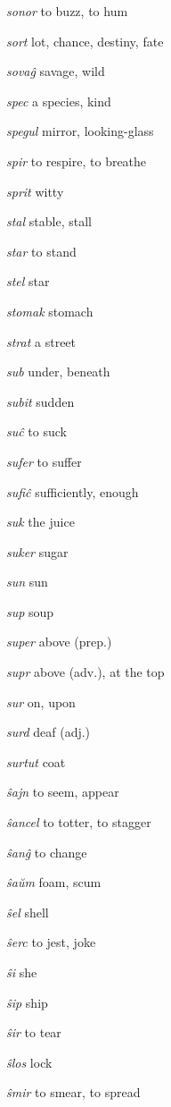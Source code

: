 \begin{landscape}
\begin{multicols}{5}
\begin{outdent}{1em}
\emph{sonor}  to buzz, to hum

\emph{sort } lot, chance, destiny, fate

\emph{sovaĝ}  savage, wild

\emph{spec}  a species, kind

\emph{spegul}  mirror, looking-glass

\emph{spir } to respire, to breathe

\emph{sprit}  witty

\emph{stal}  stable, stall

\emph{star}  to stand

\emph{stel}  star

\emph{stomak}  stomach

\emph{strat}  a street

\emph{sub } under, beneath

\emph{subit}  sudden

\emph{suĉ}  to suck

\emph{sufer}  to suffer

\emph{sufiĉ } sufficiently, enough

\emph{suk } the juice

\emph{suker}  sugar

\emph{sun } sun

\emph{sup } soup

\emph{super}  above (prep.)

\emph{supr}  above (adv.), at the top

\emph{sur}  on, upon

\emph{surd}  deaf (adj.)

\emph{surtut}  coat
\end{outdent}


\begin{outdent}{1em}
\emph{ŝajn}  to seem, appear

\emph{ŝancel}  to totter, to stagger

\emph{ŝanĝ}  to change

\emph{ŝaŭm}  foam, scum

\emph{ŝel}  shell

\emph{ŝerc}  to jest, joke

\emph{ŝi } she

\emph{ŝip } ship

\emph{ŝir}  to tear

\emph{ŝlos}  lock

\emph{ŝmir}  to smear, to spread


\end{outdent}
\end{multicols}
\end{landscape}
